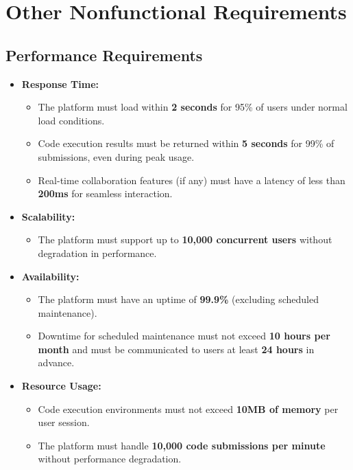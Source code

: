 \documentclass[a4paper, 11pt]{scrreprt}
\begin{document}
\chapter{Other Nonfunctional Requirements}

\section{Performance Requirements}
\begin{itemize}
    \item \textbf{Response Time:}
    \begin{itemize}
        \item The platform must load within \textbf{2 seconds} for 95\% of users under normal load conditions.
        \item Code execution results must be returned within \textbf{5 seconds} for 99\% of submissions, even during peak usage.
        \item Real-time collaboration features (if any) must have a latency of less than \textbf{200ms} for seamless interaction.
    \end{itemize}

    \item \textbf{Scalability:}
    \begin{itemize}
        \item The platform must support up to \textbf{10,000 concurrent users} without degradation in performance.
    \end{itemize}

    \item \textbf{Availability:}
    \begin{itemize}
        \item The platform must have an uptime of \textbf{99.9\%} (excluding scheduled maintenance).
        \item Downtime for scheduled maintenance must not exceed \textbf{10 hours per month} and must be communicated to users at least \textbf{24 hours} in advance.
    \end{itemize}

    \item \textbf{Resource Usage:}
    \begin{itemize}
        \item Code execution environments must not exceed \textbf{10MB of memory} per user session.
        \item The platform must handle \textbf{10,000 code submissions per minute} without performance degradation.
    \end{itemize}
\end{itemize}
\end{document}
